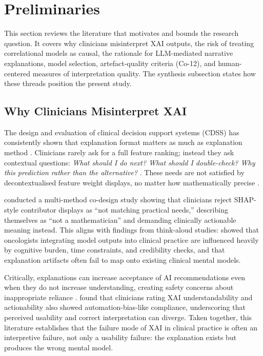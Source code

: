 \documentclass[12pt, a4paper]{article}
\begin{document}
\section{Preliminaries}
\label{sec:prelim}

This section reviews the literature that motivates and bounds the research
question.
It covers why clinicians misinterpret XAI outputs, the risk of treating
correlational models as causal, the rationale for LLM-mediated narrative
explanations, model selection, artefact-quality criteria (Co-12), and
human-centered measures of interpretation quality.
The synthesis subsection states how these threads position the present study.

\subsection{Why Clinicians Misinterpret XAI}
\label{sec:prelim_clinician}

The design and evaluation of clinical decision support systems (CDSS) has
consistently shown that explanation format matters as much as explanation
method \citep{tonekaboni2019clinicians, bienefeld2023solving}. Clinicians
rarely ask for a full feature ranking; instead they ask contextual questions:
\emph{What should I do next? What should I double-check? Why this prediction
rather than the alternative?} \citep{liao2020questioning}. These needs are
not satisfied by decontextualised feature weight displays, no matter how
mathematically precise \citep{tonekaboni2019clinicians}.

\citet{bienefeld2023solving} conducted a multi-method co-design study
showing that clinicians reject SHAP-style contributor displays as ``not
matching practical needs,'' describing themselves as ``not a mathematician''
and demanding clinically actionable meaning instead. This aligns with findings
from think-aloud studies: \citet{anjara2023examining} showed that oncologists
integrating model outputs into clinical practice are influenced heavily by
cognitive burden, time constraints, and credibility checks, and that explanation
artifacts often fail to map onto existing clinical mental models.

Critically, explanations can increase acceptance of AI recommendations
even when they do not increase understanding, creating safety concerns about
inappropriate reliance \citep{ghassemi2021false, bansal2021does}. 
\citet{bergomi2025which} found that clinicians rating XAI understandability
and actionability also showed automation-bias-like compliance, underscoring
that perceived usability and correct interpretation can diverge. Taken
together, this literature establishes that the failure mode of XAI in clinical
practice is often an interpretive failure, not only a usability
failure: the explanation exists but produces the wrong mental model.
\end{document}
